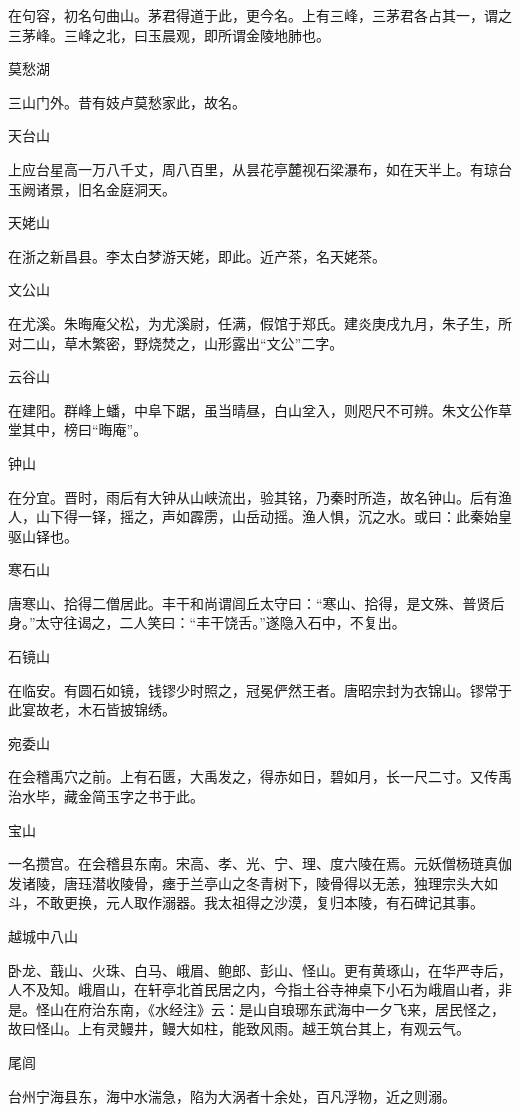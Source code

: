 \documentclass[a4paper,12pt,UTF8,twoside]{ctexbook}
\begin{document}
在句容，初名句曲山。茅君得道于此，更今名。上有三峰，三茅君各占其一，谓之三茅峰。三峰之北，曰玉晨观，即所谓金陵地肺也。

莫愁湖

三山门外。昔有妓卢莫愁家此，故名。

天台山

上应台星高一万八千丈，周八百里，从昙花亭麓视石梁瀑布，如在天半上。有琼台玉阙诸景，旧名金庭洞天。

天姥山

在浙之新昌县。李太白梦游天姥，即此。近产茶，名天姥茶。

文公山

在尤溪。朱晦庵父松，为尤溪尉，任满，假馆于郑氏。建炎庚戌九月，朱子生，所对二山，草木繁密，野烧焚之，山形露出“文公”二字。

云谷山

在建阳。群峰上蟠，中阜下踞，虽当晴昼，白山坌入，则咫尺不可辨。朱文公作草堂其中，榜曰“晦庵”。

钟山

在分宜。晋时，雨后有大钟从山峡流出，验其铭，乃秦时所造，故名钟山。后有渔人，山下得一铎，摇之，声如霹雳，山岳动摇。渔人惧，沉之水。或曰：此秦始皇驱山铎也。

寒石山

唐寒山、拾得二僧居此。丰干和尚谓闾丘太守曰：“寒山、拾得，是文殊、普贤后身。”太守往谒之，二人笑曰：“丰干饶舌。”遂隐入石中，不复出。

石镜山

在临安。有圆石如镜，钱镠少时照之，冠冕俨然王者。唐昭宗封为衣锦山。镠常于此宴故老，木石皆披锦绣。

宛委山

在会稽禹穴之前。上有石匮，大禹发之，得赤如日，碧如月，长一尺二寸。又传禹治水毕，藏金简玉字之书于此。

宝山

一名攒宫。在会稽县东南。宋高、孝、光、宁、理、度六陵在焉。元妖僧杨琏真伽发诸陵，唐珏潜收陵骨，瘗于兰亭山之冬青树下，陵骨得以无恙，独理宗头大如斗，不敢更换，元人取作溺器。我太祖得之沙漠，复归本陵，有石碑记其事。

越城中八山

卧龙、蕺山、火珠、白马、峨眉、鲍郎、彭山、怪山。更有黄琢山，在华严寺后，人不及知。峨眉山，在轩亭北首民居之内，今指土谷寺神桌下小石为峨眉山者，非是。怪山在府治东南，《水经注》云：是山自琅琊东武海中一夕飞来，居民怪之，故曰怪山。上有灵鳗井，鳗大如柱，能致风雨。越王筑台其上，有观云气。

尾闾

台州宁海县东，海中水湍急，陷为大涡者十余处，百凡浮物，近之则溺。
\end{document}

